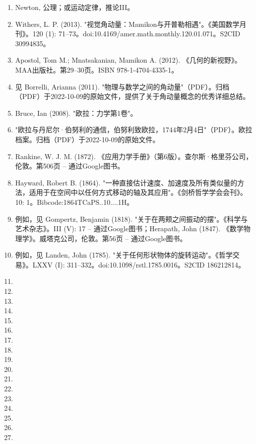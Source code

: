 \begin{enumerate}
\item Newton, 公理；或运动定律，推论III。
\item Withers, L. P. (2013). "视觉角动量：Mamikon与开普勒相遇"。《美国数学月刊》。120 (1): 71–73。doi:10.4169/amer.math.monthly.120.01.071。S2CID 30994835。
\item Apostol, Tom M.; Mnatsakanian, Mamikon A. (2012). 《几何的新视野》。MAA出版社。第29–30页。ISBN 978-1-4704-4335-1。
\item 见 Borrelli, Arianna (2011). "物理与数学之间的角动量"（PDF）。归档（PDF）于2022-10-09的原始文件，提供了关于角动量概念的优秀详细总结。
\item Bruce, Ian (2008). "欧拉：力学第1卷"。
\item "欧拉与丹尼尔·伯努利的通信，伯努利致欧拉，1744年2月4日"（PDF）。欧拉档案。归档（PDF）于2022-10-09的原始文件。
\item Rankine, W. J. M. (1872). 《应用力学手册》（第6版）。查尔斯·格里芬公司，伦敦。第506页 – 通过Google图书。
\item Hayward, Robert B. (1864). "一种直接估计速度、加速度及所有类似量的方法，适用于在空间中以任何方式移动的轴及其应用"。《剑桥哲学学会会刊》。10: 1。Bibcode:1864TCaPS..10....1H。
\item 例如，见 Gompertz, Benjamin (1818). "关于在两颊之间振动的摆"。《科学与艺术杂志》。III (V): 17 – 通过Google图书；Herapath, John (1847). 《数学物理学》。威塔克公司，伦敦。第56页 – 通过Google图书。
\item 例如，见 Landen, John (1785). "关于任何形状物体的旋转运动"。《哲学交易》。LXXV (I): 311–332。doi:10.1098/rstl.1785.0016。S2CID 186212814。
\item 
\item 
\item 
\item 
\item 
\item 
\item 
\item 
\item 
\item 
\item 
\item 
\item 
\item 
\item 
\item 
\item 

\end{enumerate}


